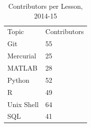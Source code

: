 \documentclass[10pt,a4paper,twocolumn]{article}
\begin{document}
\begin{table}
\centering
\begin{tabular}{ll}
Topic & Contributors \\
Git & 55 \\
Mercurial & 25 \\
MATLAB & 28 \\
Python & 52 \\
R & 49 \\
Unix Shell & 64 \\
SQL & 41
\end{tabular}
\caption{Contributors per Lesson, 2014-15}
\label{t:authors-per-lesson}
\end{table}
\end{document}

